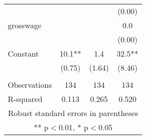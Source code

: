 \documentclass[]{article}
\begin{document}
\begin{tabular}{lccc}
 &  &  & (0.00) \\
grosswage &  &  & 0.0 \\
 &  &  & (0.00) \\
Constant & 10.1** & 1.4 & 32.5** \\
 & (0.75) & (1.64) & (8.46) \\
 &  &  &  \\
Observations & 134 & 134 & 134 \\
 R-squared & 0.113 & 0.265 & 0.520 \\ \hline
\multicolumn{4}{c}{ Robust standard errors in parentheses} \\
\multicolumn{4}{c}{ ** p$<$0.01, * p$<$0.05} \\
\end{tabular}
\end{document}
